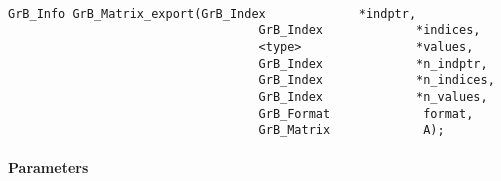 \paragraph{\syntax}

\begin{Verbatim}[samepage=true]    
        GrB_Info GrB_Matrix_export(GrB_Index             *indptr,
                                   GrB_Index             *indices,
                                   <type>                *values,
                                   GrB_Index             *n_indptr, 
                                   GrB_Index             *n_indices, 
                                   GrB_Index             *n_values, 
                                   GrB_Format             format,
                                   GrB_Matrix             A);
\end{Verbatim}

\paragraph{Parameters}

